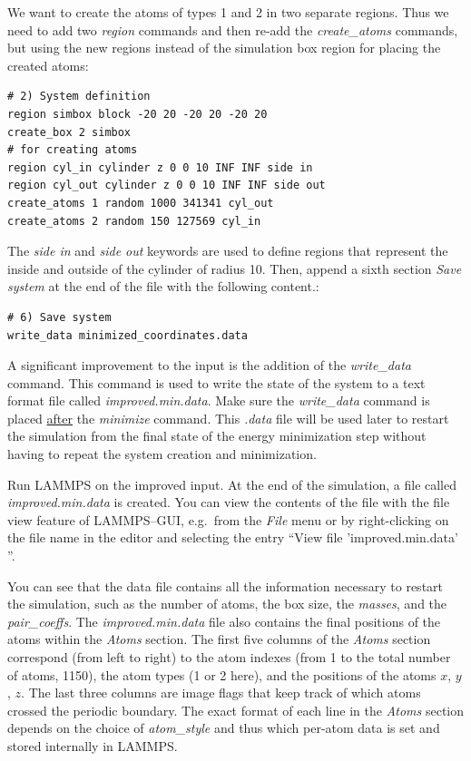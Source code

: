 \documentclass[9pt,tutorial]{livecoms}
\renewcommand{\emph}[1]{\underline{#1}}
\begin{document}
We want to create the atoms of types 1 and 2 in two separate
regions.  Thus we need to add two \textit{region} commands and then
re-add the \textit{create\_atoms} commands, but using the new regions
instead of the simulation box region for placing the created atoms:
\begin{lstlisting}
# 2) System definition
region simbox block -20 20 -20 20 -20 20
create_box 2 simbox
# for creating atoms
region cyl_in cylinder z 0 0 10 INF INF side in
region cyl_out cylinder z 0 0 10 INF INF side out
create_atoms 1 random 1000 341341 cyl_out
create_atoms 2 random 150 127569 cyl_in
\end{lstlisting}
The \textit{side in} and \textit{side out} keywords are used to define
regions that represent the inside and outside of the cylinder of radius
10. Then, append a sixth section \textit{Save system} at the end of the
file with the following content.:
\begin{lstlisting}
# 6) Save system
write_data minimized_coordinates.data
\end{lstlisting}

A significant improvement to the input is the addition of the
\textit{write\_data} command.  This command is used to write the state
of the system to a text format file called \textit{improved.min.data}.
Make sure the \textit{write\_data} command is placed \emph{after} the
\textit{minimize} command.  This \textit{.data} file will be used later
to restart the simulation from the final state of the energy
minimization step without having to repeat the system creation and
minimization.

Run LAMMPS on the improved input.  At the end of the simulation, a file
called \textit{improved.min.data} is created.  You can view the contents
of the file with the file view feature of LAMMPS--GUI, e.g.~from the
\textit{File} menu or by right-clicking on the file name in the editor
and selecting the entry ``View file 'improved.min.data' ''.

You can see that the data file contains all the information necessary to
restart the simulation, such as the number of atoms, the box size, the
\textit{masses}, and the \textit{pair\_coeffs}.  The
\textit{improved.min.data} file also contains the final
positions of the atoms within the \textit{Atoms} section. The first five
columns of the \textit{Atoms} section correspond (from left to right) to
the atom indexes (from 1 to the total number of atoms, 1150), the atom
types (1 or 2 here), and the positions of the atoms $x$, $y$, $z$. The
last three columns are image flags that keep track of which atoms
crossed the periodic boundary.  The exact format of each line in the
\textit{Atoms} section depends on the choice of \textit{atom\_style} and
thus which per-atom data is set and stored internally in LAMMPS.
\end{document}

